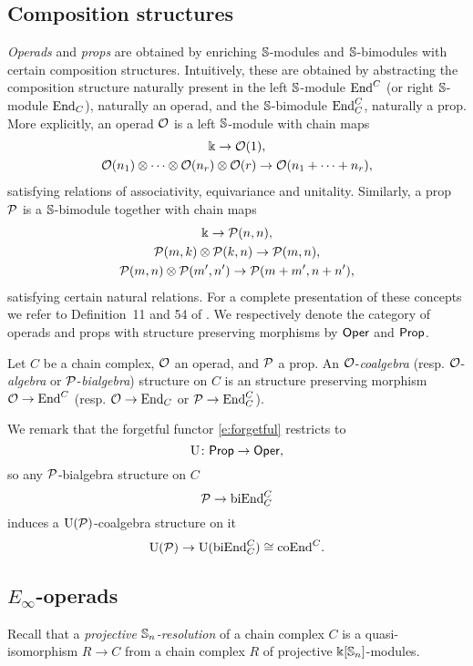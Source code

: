 \subsection{Composition structures}

\textit{Operads} and \textit{props} are obtained by enriching $\mathbb{S}$-modules and $\mathbb{S}$-bimodules with certain composition structures.
Intuitively, these are obtained by abstracting the composition structure naturally present in the left $\mathbb{S}$-module $\mathrm{End}^C$ (or right $\mathbb{S}$-module $\mathrm{End}_C$), naturally an operad, and the $\mathbb{S}$-bimodule $\mathrm{End}^C_C$, naturally a prop.
More explicitly, an operad $\mathcal{O}$ is a left $\mathbb{S}$-module with chain maps
\begin{gather*}
	\Bbbk \to \mathcal{O}(1), \\
	\mathcal{O}(n_1) \otimes \dotsb \otimes \mathcal{O}(n_r) \otimes \mathcal{O}(r) \to \mathcal{O}(n_1 + \dots + n_r),
\end{gather*}
satisfying relations of associativity, equivariance and unitality.
Similarly, a prop $\mathcal{P}$ is a $\mathbb{S}$-bimodule together with chain maps
\begin{gather*}
	\Bbbk \to \mathcal{P}(n,n), \\
	\mathcal{P}(m,k) \otimes \mathcal{P}(k,n) \to \mathcal{P}(m,n), \\
	\mathcal{P}(m,n) \otimes \mathcal{P}(m',n') \to \mathcal{P}(m+m',n+n'),
\end{gather*}
satisfying certain natural relations.
For a complete presentation of these concepts we refer to Definition~11 and 54 of \cite{markl2008props}.
We respectively denote the category of operads and props with structure preserving morphisms by $\mathsf{Oper}$ and $\mathsf{Prop}$.

Let $C$ be a chain complex, $\mathcal{O}$ an operad, and $\mathcal{P}$ a prop.
An $\mathcal{O}$-\textit{coalgebra} (resp. $\mathcal{O}$-\textit{algebra} or $\mathcal{P}$-\textit{bialgebra}) structure on $C$ is an structure preserving morphism $\mathcal{O} \to \mathrm{End}^C$ (resp. $\mathcal{O} \to \mathrm{End}_C$ or $\mathcal{P} \to \mathrm{End}_C^C$).

We remark that the forgetful functor \eqref{e:forgetful} restricts to
\[
\operatorname{U} \colon \mathsf{Prop} \to \mathsf{Oper},
\]
so any $\mathcal{P}$-bialgebra structure on $C$
\[
\mathcal{P} \to \mathrm{biEnd}_C^C
\]
induces a $\operatorname{U}(\mathcal{P})$-coalgebra structure on it
\[
\operatorname{U}(\mathcal{P}) \to \operatorname{U}(\mathrm{biEnd}_C^C) \cong \mathrm{coEnd}^C.
\]

\subsection{\texorpdfstring{${E_\infty}$}{E-infty}-operads}

Recall that a \textit{projective $\mathbb{S}_n$-resolution} of a chain complex $C$ is a quasi-isomorphism $R \to C$ from a chain complex $R$ of projective $\Bbbk[\mathbb{S}_n]$-modules.

